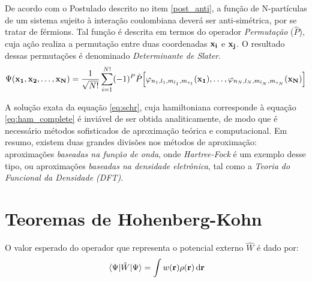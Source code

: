 De acordo com o Postulado descrito no item \ref{post_anti}, a função de N-partículas de um sistema sujeito à interação coulombiana deverá ser anti-simétrica, por se tratar de férmions. Tal função é descrita em termos do operador \textit{Permutação} ($ \hat{P} $), cuja ação realiza a permutação entre duas coordenadas $ \vb{x_i} $ e $ \vb{x_j} $. O resultado dessas permutações é denominado \textit{Determinante de Slater}.
\begin{equation}\label{eq:wave_anti}
	\Psi(\vb{x_1},\vb{x_2},\ldots,\vb{x_N})=\frac{1}{\sqrt{N!}}\sum^{N!}_{i=1}(-1)^{P}\hat{P}\bqty{\varphi_{n_{1},l_{1},m_{l_{1}},m_{s_{1}}}(\vb{x_1}),\ldots,\varphi_{n_{N},l_{N},m_{l_{N}},m_{s_{N}}}(\vb{x_N})}
\end{equation}

A solução exata da equação \eqref{eq:schr}, cuja hamiltoniana corresponde à equação \ref{eq:ham_complete} é inviável de ser obtida analiticamente, de modo que é necessário métodos sofisticados de aproximação teórica e computacional. Em resumo, existem duas grandes divisões nos métodos de aproximação: aproximações \textit{baseadas na função de onda}, onde \textit{Hartree-Fock} é um exemplo desse tipo, ou aproximações \textit{baseadas na densidade eletrônica}, tal como a \textit{Teoria do Funcional da Densidade (DFT)}. \cite{hf_pedroza}

\section{Teoremas de Hohenberg-Kohn}

\begin{lema}
	O valor esperado do operador que representa o potencial externo $ \hat{W} $ é dado por:
	\begin{equation}
		\ev{\hat{W}}{\Psi}= \int w(\vb{r})\dens\dr
	\end{equation} 
\end{lema}

